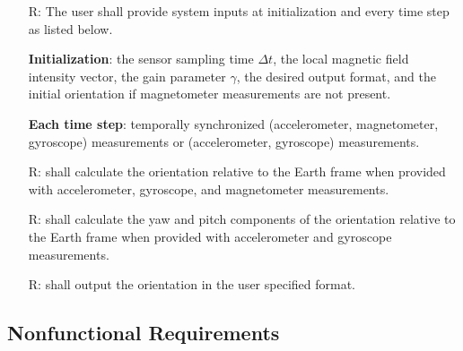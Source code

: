 \documentclass[12pt]{article}
\begin{document}
\begin{itemize}
    \item[R\refstepcounter{reqnum}\thereqnum \label{r:inputs}:]  The user shall provide
    system inputs at initialization and every time step as listed below.
    
    \textbf{Initialization}: the sensor sampling time $\Delta t$, the local magnetic field intensity
    vector, the gain parameter $\gamma$, the desired output format, and the initial orientation if
    magnetometer measurements are not present.

    \textbf{Each time step}: temporally synchronized (accelerometer, magnetometer, gyroscope)
    measurements or (accelerometer, gyroscope) measurements.
    
    \item[R\refstepcounter{reqnum}\thereqnum \label{r:calculate1}:] \progname{} shall calculate the
    orientation relative to the Earth frame when provided with  accelerometer, gyroscope, and
    magnetometer measurements.
    
    \item[R\refstepcounter{reqnum}\thereqnum \label{r:calculate2}:] \progname{} shall calculate the
    yaw and pitch components of the orientation relative to the Earth frame when provided with
    accelerometer and gyroscope measurements.
    
    \item[R\refstepcounter{reqnum}\thereqnum \label{r:output}:] 
    \progname{} shall output the orientation in the user specified format.
\end{itemize}


\subsection{Nonfunctional Requirements}
\end{document}
